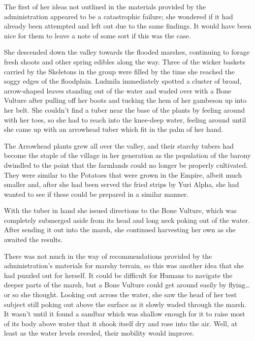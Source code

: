  

The first of her ideas not outlined in the materials provided by the administration appeared to be a catastrophic failure; she wondered if it had already been attempted and left out due to the same findings. It would have been nice for them to leave a note of some sort if this was the case.

 

She descended down the valley towards the flooded marshes, continuing to forage fresh shoots and other spring edibles along the way. Three of the wicker baskets carried by the Skeletons in the group were filled by the time she reached the soggy edges of the floodplain. Ludmila immediately spotted a cluster of broad, arrow-shaped leaves standing out of the water and waded over with a Bone Vulture after pulling off her boots and tucking the hem of her gambeson up into her belt. She couldn’t find a tuber near the base of the plants by feeling around with her toes, so she had to reach into the knee-deep water, feeling around until she came up with an arrowhead tuber which fit in the palm of her hand.

 

The Arrowhead plants grew all over the valley, and their starchy tubers had become the staple of the village in her generation as the population of the barony dwindled to the point that the farmlands could no longer be properly cultivated. They were similar to the Potatoes that were grown in the Empire, albeit much smaller and, after she had been served the fried strips by Yuri Alpha, she had wanted to see if these could be prepared in a similar manner.

 

With the tuber in hand she issued directions to the Bone Vulture, which was completely submerged aside from its head and long neck poking out of the water. After sending it out into the marsh, she continued harvesting her own as she awaited the results.

 

There was not much in the way of recommendations provided by the administration’s materials for marshy terrain, so this was another idea that she had puzzled out for herself. It could be difficult for Humans to navigate the deeper parts of the marsh, but a Bone Vulture could get around easily by flying…or so she thought. Looking out across the water, she saw the head of her test subject still poking out above the surface as it slowly waded through the marsh. It wasn’t until it found a sandbar which was shallow enough for it to raise most of its body above water that it shook itself dry and rose into the air. Well, at least as the water levels receded, their mobility would improve.

